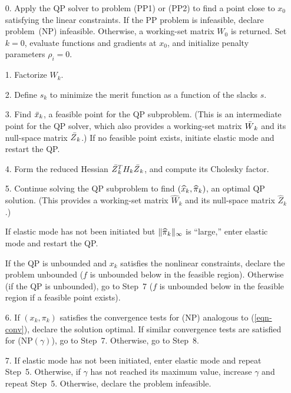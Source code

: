 \documentclass[draft,leqno,onefignum,onetabnum]{siamltex}
\def\norm#1{\|#1\|}
\def\pihat{\skew1\widehat \pi}
\def\Wbar{\skew3\bar W}
\def\What{\widehat W}
\def\xbar{\skew{2.8}\bar x}
\def\xhat{\skew{2.8}\widehat x}
\def\Zbar{\skew5\bar Z}
\def\Zhat{\widehat Z}
\def\NP#1{NP$(#1)$}
\newcommand{\infnorm}[1]{\norm{#1}_{\infty}}
\begin{document}
\begin{enumerate}
 \item[0.] Apply the QP solver to problem (PP1) or (PP2) to find a
point close to $x_0$ satisfying the linear constraints. If
the PP problem is infeasible, declare problem~(NP) infeasible. Otherwise,
a working-set matrix $W_0$ is returned.
Set $k = 0$, evaluate functions and gradients at $x_0$,
and initialize penalty parameters $\rho_i = 0$.

 \item[1.]  Factorize $W_k$.  %

 \item[2.]  Define $s_k$ to minimize the merit function as a
   function of the slacks $s$.

 \item[3.]  Find $\xbar_k$, a feasible point for the QP
subproblem. (This is an intermediate point for the QP solver, which
also provides a working-set matrix $\Wbar_k$ and its null-space matrix
$\Zbar_k$.)  If no feasible point exists, initiate elastic mode
and restart the QP\@.

 \item[4.]  Form the reduced Hessian $\Zbar_k^T H_k \Zbar_k$,
and compute its Cholesky factor.

 \item[5.]  Continue solving the QP subproblem to find
$(\xhat_k,\pihat_k)$, an optimal QP solution. (This provides a
working-set matrix $\What_k$ and its null-space matrix $\Zhat_k$.)

If elastic mode has not been initiated but $\infnorm{\pihat_k}$
is ``large,'' enter elastic mode and restart the QP\@.

    If the QP is unbounded and $x_k$ satisfies the nonlinear
constraints, declare the problem unbounded  ($f$ is unbounded below
in the feasible region).  Otherwise (if the QP is unbounded),
go to Step~7  ($f$ is unbounded below
in the feasible region if a feasible point exists).

 \item[6.]  If $(x_k, \pi_k)$ satisfies the convergence tests for (NP)
analogous to (\ref{eqn-conv}), declare the solution optimal.
If similar convergence tests are satisfied for (\NP{\gamma}), go to Step~7.
Otherwise, go to Step~8.

\item[7.] If elastic mode has not been initiated, enter elastic mode
and repeat Step~5.
Otherwise, if $\gamma$ has not reached its maximum value, increase
$\gamma$ and repeat Step~5.
Otherwise, declare the problem infeasible.


\end{enumerate}
\end{document}
